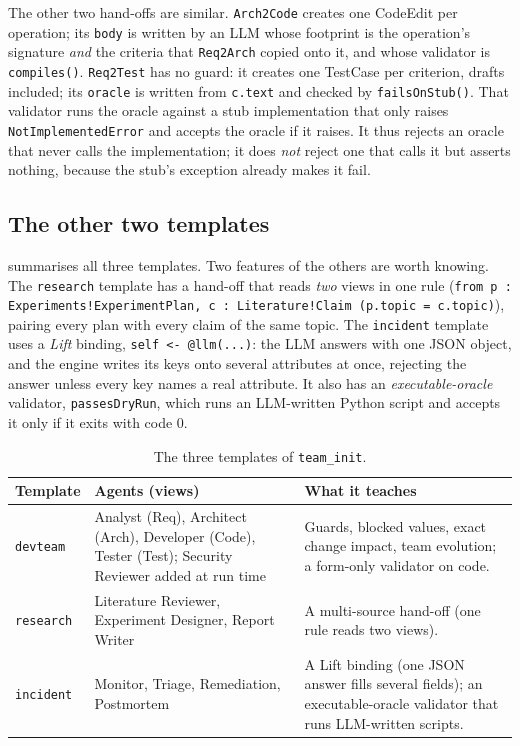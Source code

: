 \documentclass[10pt,a4paper]{article}
\newcommand{\cls}[1]{\textsf{#1}}
\newcommand{\code}[1]{\texttt{#1}}
\newcommand{\mcptool}[1]{\texttt{#1}}
\begin{document}
The other two hand-offs are similar. \code{Arch2Code} creates one
\cls{CodeEdit} per operation; its \code{body} is written by an LLM whose
footprint is the operation's signature \emph{and} the criteria that
\code{Req2Arch} copied onto it, and whose validator is \code{compiles()}.
\code{Req2Test} has no guard: it creates one \cls{TestCase} per criterion,
drafts included; its \code{oracle} is written from \code{c.text} and checked
by \code{failsOnStub()}. That validator runs the oracle against a stub
implementation that only raises \code{NotImplementedError} and accepts the
oracle if it raises. It thus rejects an oracle that never calls the
implementation; it does \emph{not} reject one that calls it but asserts
nothing, because the stub's exception already makes it fail.

\subsection{The other two templates}

 summarises all three templates. Two features of the
others are worth knowing. The \code{research} template has a hand-off that
reads \emph{two} views in one rule (\code{from p : Experiments!ExperimentPlan,
c : Literature!Claim (p.topic = c.topic)}), pairing every plan with every
claim of the same topic. The \code{incident} template uses a \emph{Lift}
binding, \code{self <- @llm(...)}: the LLM answers with one JSON object, and
the engine writes its keys onto several attributes at once, rejecting the
answer unless every key names a real attribute. It also has an
\emph{executable-oracle} validator, \code{passesDryRun}, which runs an
LLM-written Python script and accepts it only if it exits with code 0.

\begin{table}[!htb]
\centering\small
\caption{The three templates of \mcptool{team\_init}.}
\label{tab:templates}
\begin{tabularx}{\textwidth}{@{}l L{4.4cm} Y@{}}
\toprule
{}Template & Agents (views) & What it teaches \\
\midrule
\code{devteam} & Analyst (Req), Architect (Arch), Developer (Code), Tester (Test); Security Reviewer added at run time & Guards, blocked values, exact change impact, team evolution; a form-only validator on code. \\
\code{research} & Literature Reviewer, Experiment Designer, Report Writer & A multi-source hand-off (one rule reads two views). \\
\code{incident} & Monitor, Triage, Remediation, Postmortem & A Lift binding (one JSON answer fills several fields); an executable-oracle validator that runs LLM-written scripts. \\
\bottomrule
\end{tabularx}
\end{table}
\end{document}
